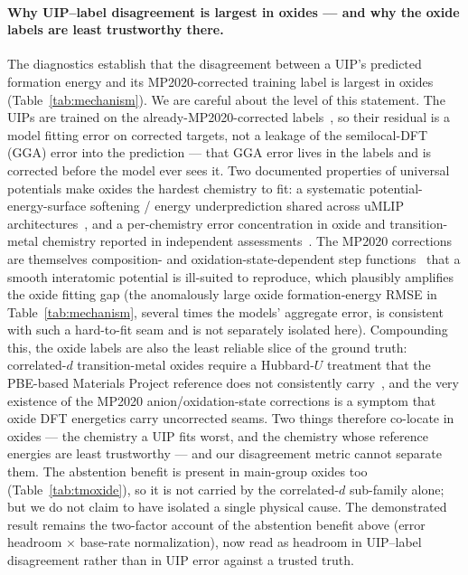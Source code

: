 \documentclass[11pt]{article}
\begin{document}
\paragraph{Why UIP--label disagreement is largest in oxides --- and why the oxide labels are
least trustworthy there.} The diagnostics establish that the disagreement between a UIP's
predicted formation energy and its MP2020-corrected training label is largest in oxides
(Table~\ref{tab:mechanism}). We are careful about the level of this statement. The UIPs are
trained on the already-MP2020-corrected labels~\citep{deng2023,wang2021mp2020}, so their
residual is a model fitting error on corrected targets, not a leakage of the semilocal-DFT
(GGA) error into the prediction --- that GGA error lives in the labels and is corrected before the
model ever sees it. Two documented properties of universal potentials make oxides the hardest
chemistry to fit: a systematic potential-energy-surface softening / energy underprediction shared
across uMLIP architectures~\citep{deng2025softening}, and a per-chemistry error concentration in
oxide and transition-metal chemistry reported in independent
assessments~\citep{yu2024assessment}. The MP2020 corrections are themselves
composition- and oxidation-state-dependent step functions~\citep{wang2021mp2020} that a smooth
interatomic potential is ill-suited to reproduce, which plausibly amplifies the oxide fitting gap
(the anomalously large oxide formation-energy RMSE in Table~\ref{tab:mechanism}, several times the
models' aggregate error, is consistent with such a hard-to-fit seam and is not separately
isolated here). Compounding this, the oxide labels are also the least reliable slice of the
ground truth: correlated-$d$ transition-metal oxides require a Hubbard-$U$ treatment that the
PBE-based Materials Project reference does not consistently carry~\citep{wang2006oxidation,
jain2011formation}, and the very existence of the MP2020 anion/oxidation-state corrections is a
symptom that oxide DFT energetics carry uncorrected seams. Two things therefore co-locate in
oxides --- the chemistry a UIP fits worst, and the chemistry whose reference energies are least
trustworthy --- and our disagreement metric cannot separate them. The abstention benefit is
present in main-group oxides too (Table~\ref{tab:tmoxide}), so it is not carried by the
correlated-$d$ sub-family alone; but we do not claim to have isolated a single physical cause. The
demonstrated result remains the two-factor account of the abstention benefit above (error headroom
$\times$ base-rate normalization), now read as headroom in UIP--label disagreement rather
than in UIP error against a trusted truth.
\end{document}
